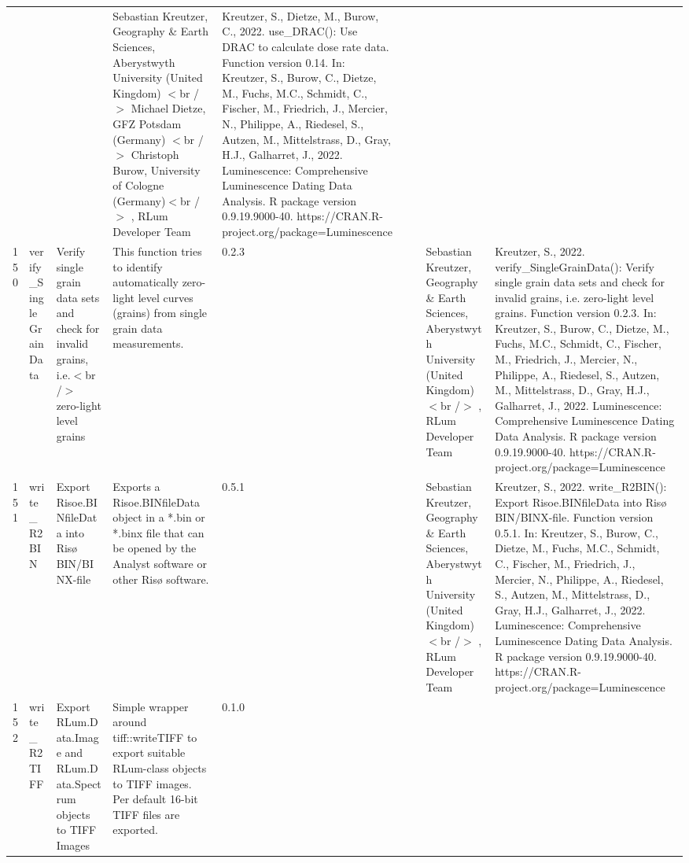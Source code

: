 \begin{table}[ht]
\begin{tabular}{rllllllll}
 &  &  & Sebastian Kreutzer, Geography \& Earth Sciences, Aberystwyth University (United Kingdom) $<$br /$>$ Michael Dietze, GFZ Potsdam (Germany) $<$br /$>$ Christoph Burow, University of Cologne (Germany)$<$br /$>$ , RLum Developer Team & Kreutzer, S., Dietze, M., Burow, C., 2022. use\_DRAC(): Use DRAC to calculate dose rate data. Function version 0.14. In: Kreutzer, S., Burow, C., Dietze, M., Fuchs, M.C., Schmidt, C., Fischer, M., Friedrich, J., Mercier, N., Philippe, A., Riedesel, S., Autzen, M., Mittelstrass, D., Gray, H.J., Galharret, J., 2022. Luminescence: Comprehensive Luminescence Dating Data Analysis. R package version 0.9.19.9000-40. https://CRAN.R-project.org/package=Luminescence
 \\ 
  150 & verify\_SingleGrainData & Verify single grain data sets and check for invalid grains, i.e.$<$br /$>$ zero-light level grains & This function tries to identify automatically zero-light level curves (grains) from single grain data measurements. & 0.2.3
 &  &  & Sebastian Kreutzer, Geography \& Earth Sciences, Aberystwyth University (United Kingdom)$<$br /$>$ , RLum Developer Team & Kreutzer, S., 2022. verify\_SingleGrainData(): Verify single grain data sets and check for invalid grains, i.e. zero-light level grains. Function version 0.2.3. In: Kreutzer, S., Burow, C., Dietze, M., Fuchs, M.C., Schmidt, C., Fischer, M., Friedrich, J., Mercier, N., Philippe, A., Riedesel, S., Autzen, M., Mittelstrass, D., Gray, H.J., Galharret, J., 2022. Luminescence: Comprehensive Luminescence Dating Data Analysis. R package version 0.9.19.9000-40. https://CRAN.R-project.org/package=Luminescence
 \\ 
  151 & write\_R2BIN & Export Risoe.BINfileData into Risø BIN/BINX-file & Exports a Risoe.BINfileData object in a *.bin or *.binx file that can be opened by the Analyst software or other Risø software. & 0.5.1
 &  &  & Sebastian Kreutzer, Geography \& Earth Sciences, Aberystwyth University (United Kingdom)$<$br /$>$ , RLum Developer Team & Kreutzer, S., 2022. write\_R2BIN(): Export Risoe.BINfileData into Risø BIN/BINX-file. Function version 0.5.1. In: Kreutzer, S., Burow, C., Dietze, M., Fuchs, M.C., Schmidt, C., Fischer, M., Friedrich, J., Mercier, N., Philippe, A., Riedesel, S., Autzen, M., Mittelstrass, D., Gray, H.J., Galharret, J., 2022. Luminescence: Comprehensive Luminescence Dating Data Analysis. R package version 0.9.19.9000-40. https://CRAN.R-project.org/package=Luminescence
 \\ 
  152 & write\_R2TIFF & Export RLum.Data.Image and RLum.Data.Spectrum objects to TIFF Images & Simple wrapper around  tiff::writeTIFF  to export suitable RLum-class objects to TIFF images. Per default 16-bit TIFF files are exported. & 0.1.0

\end{tabular}
\end{table}
